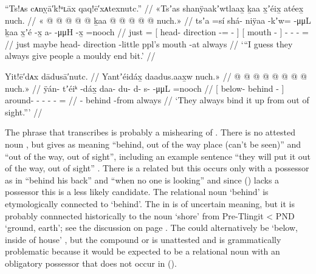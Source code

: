 \ex\label{ex:099-13-always-give-mouldy-end-bit}%
%
\begingl
	\glpreamble	“Ts!ᴀs cᴀnỵā′k!ᵘʟāx qaq!ē′xᴀtexnutc.” //
	\glpreamble	«\!Tsʼas shanÿaakʼwtlaax̱ ḵaa x̱ʼéix̱ atéex̱ nuch. //
	\gla	«\! @ {}
		{}  @ {} @ {} @ {} @ {} {}
		{} ḵaa  @ {} {}
		 @ {} @ {} @ {} @ \•nuch.\!» //
	\glb	\pqp{}tsʼa =sí
		{} shá- niÿaa -kʼw=  -μμL {}
		{} ḵaa x̱ʼé -x̱ {}
		a-  -μμH -x̱ =nooch //
	\glc	\pqp{}just =
		{}[ head- direction -=  - {}]
		{}[  mouth - {}]
		-  - - = //
	\gld	\pqp{}just \•maybe
		{} head- direction -little  {} {}
		{} ppl’s mouth -at {}
		 {} {} {} {} \•always //
	\glft	‘“I guess they always give people a mouldy end bit.’
		//
\endgl
\xe

\ex\label{ex:099-14-bind-up-out-of-sight}%
%
\begingl
	\glpreamble	Yit!ē′dᴀx dādusā′nutc. //
	\glpreamble	Yantʼéidáx̱ daadus.aax̱w nuch.\!» //
	\gla	{}  @ {} @ {} {}
		 @ {} @ {} @ {} @ {} @ {} @ \•nuch.\!» //
	\glb	{} ÿán- tʼéiᵏ -dáx̱ {}
		daa- du- d- s-  -μμL =nooch //
	\glc	{}[ below- behind - {}]
		around- - - -  - = //
	\gld	{} - behind -from {}
		 {} {} {} {} {} \•always //
	\glft	‘They always bind it up from out of sight.”’
		//
\endgl
\xe

The phrase that \citeauthor{swanton:1909} transcribes  is probably a mishearing of .
There is no attested noun , but \citeauthor{leer:1973} gives  as meaning “behind, out of the way place (can’t be seen)” and “out of the way, out of sight”, including an example sentence  “they will put it out of the way, out of sight” \parencite[07/123]{leer:1976}.
There is a related  but this occurs only with a possessor as in  “behind his back” and  “when no one is looking” \parencite[07/122]{leer:1976} and since (\lastx) lacks a possessor this is a less likely candidate.
The relational noun  ‘behind’ is etymologically connected to  ‘behind’.
The  in  is of uncertain meaning, but it is probably connnected historically to the noun  ‘shore’ from Pre-Tlingit  < PND  ‘ground, earth’; see the discussion on page \pageref{note:100-shore-discussion}.
The  could alternatively be  ‘below, inside of house’ \parencite[cf.][3]{littlefield-makinen:2003}, but the compound  or  is unattested and is grammatically problematic because it would be expected to be a relational noun with an obligatory possessor that does not occur in (\lastx).

